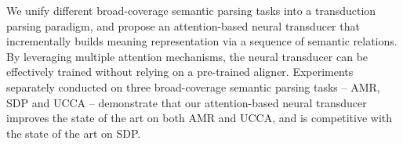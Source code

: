 We unify different broad-coverage semantic parsing tasks into a transduction parsing paradigm, and propose an attention-based neural transducer that incrementally builds meaning representation via a sequence of semantic relations. By leveraging multiple attention mechanisms, the neural transducer can be effectively trained without relying on a pre-trained aligner. Experiments separately conducted on three broad-coverage semantic parsing tasks -- AMR, SDP and UCCA -- demonstrate that our attention-based neural transducer improves the state of the art on both AMR and UCCA, and is competitive with the state of the art on SDP.